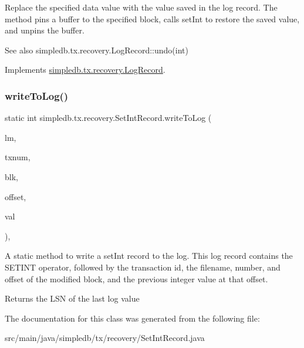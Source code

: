 Replace the specified data value with the value saved in the log record. The method pins a buffer to the specified block, calls set\+Int to restore the saved value, and unpins the buffer. \begin{DoxySeeAlso}{See also}
simpledb.\+tx.\+recovery.\+Log\+Record\+::undo(int) 
\end{DoxySeeAlso}


Implements \hyperlink{interfacesimpledb_1_1tx_1_1recovery_1_1LogRecord_a1f1949e7f3746b9b8b3bc985c89214e5}{simpledb.\+tx.\+recovery.\+Log\+Record}.

\mbox{\label{classsimpledb_1_1tx_1_1recovery_1_1SetIntRecord_a535ee3773e4ab25a84fe770e1953d6c4}} 
\subsubsection{\texorpdfstring{write\+To\+Log()}{writeToLog()}}
{\footnotesize\ttfamily static int simpledb.\+tx.\+recovery.\+Set\+Int\+Record.\+write\+To\+Log (\begin{DoxyParamCaption}\item[{\hyperlink{classsimpledb_1_1log_1_1LogMgr}{Log\+Mgr}}]{lm,  }\item[{int}]{txnum,  }\item[{\hyperlink{classsimpledb_1_1file_1_1BlockId}{Block\+Id}}]{blk,  }\item[{int}]{offset,  }\item[{int}]{val }\end{DoxyParamCaption})\hspace{0.3cm}{\ttfamily [inline]}, {\ttfamily [static]}}

A static method to write a set\+Int record to the log. This log record contains the S\+E\+T\+I\+NT operator, followed by the transaction id, the filename, number, and offset of the modified block, and the previous integer value at that offset. \begin{DoxyReturn}{Returns}
the L\+SN of the last log value 
\end{DoxyReturn}


The documentation for this class was generated from the following file\+:\begin{DoxyCompactItemize}
\item 
src/main/java/simpledb/tx/recovery/Set\+Int\+Record.\+java\end{DoxyCompactItemize}
